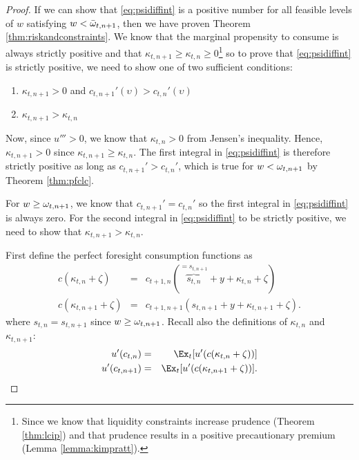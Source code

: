 \begin{proof}
If we can show that \eqref{eq:psidiffint} is a positive
number for all feasible levels of ${w}$ satisfying ${w} < {\bar{\omega}}_{t,n+1}$, then we have proven Theorem \ref{thm:riskandconstraints}. We know that the marginal propensity to consume is always strictly positive and that $\kappa_{t,n+1} \geq \kappa_{t,n} \geq 0$\footnote{Since we know that liquidity constraints increase prudence (Theorem \ref{thm:lcip}) and that prudence results in a positive precautionary premium (Lemma \ref{lemma:kimpratt}).} so to prove that \eqref{eq:psidiffint} is strictly positive, we need to show one of two sufficient conditions:
\begin{enumerate}
	\item $\kappa_{t,n+1} > 0$ and $c_{t,n+1}'(\upsilon) > c_{t,n}'(\upsilon)$
	\item $\kappa_{t,n+1} > \kappa_{t,n}$
\end{enumerate}
	Now, since $u'''>0$, we know that $\kappa_{t,n} > 0$ from Jensen's inequality. Hence, $\kappa_{t,n+1} > 0$ since $\kappa_{t,n+1} \geq \kappa_{t,n}$. The first integral in \eqref{eq:psidiffint} is therefore strictly positive as long as $c_{t,n+1}' > c_{t,n}'$, which is true for ${w} < \omega_{t,n+1}$ by Theorem \ref{thm:pfclc}.
	
	For ${w} \geq \omega_{t,n+1}$, we know that $c_{t,n+1}' = c_{t,n}'$ so the first integral in \eqref{eq:psidiffint} is always zero. For the second integral in \eqref{eq:psidiffint} to be strictly positive, we need to show that $\kappa_{t,n+1} > \kappa_{t,n}$.
	
	
	
	
	
	First define the perfect foresight consumption functions as
		\begin{eqnarray}
	c(\kappa_{t,n}+\zeta) & = & c_{t+1,n}(\overbrace{{s}_{t,n}}^{=s_{t,n+1}}+{y}+\kappa_{t,n}+\zeta) \label{eq:cnoconstr}
	\\  {c}(\kappa_{t,n+1}+\zeta) & = & c_{t+1,n+1}({s}_{t,n+1}+{y}+\kappa_{t,n+1}+\zeta)\label{eq:gravecnoconstr}.
	\end{eqnarray}	
	where $s_{t,n} = s_{t,n+1}$ since $w \geq \omega_{t,n+1}$. Recall also the definitions of $\kappa_{t,n}$ and $\kappa_{t,n+1}$:
	\begin{eqnarray*}
		u'({c}_{t,n}) & = & \Ex_{t}[u'(c(\kappa_{t,n}+\zeta))]
		\\  u'({c}_{t,n+1}) & = & \Ex_{t}[u'({c}(\kappa_{t,n+1}+\zeta))].
	\end{eqnarray*}


\end{proof}
